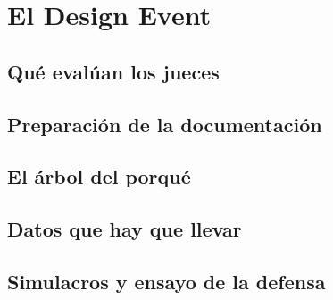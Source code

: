\chapter{El Design Event}
\label{ch:design_event}

\begin{objetivos}
  \item {}
  \item {}
  \item {}
\end{objetivos}


\section{Qué evalúan los jueces}
\label{sec:design_event:01}

\section{Preparación de la documentación}
\label{sec:design_event:02}

\section{El árbol del porqué}
\label{sec:design_event:03}

\section{Datos que hay que llevar}
\label{sec:design_event:04}

\section{Simulacros y ensayo de la defensa}
\label{sec:design_event:05}


